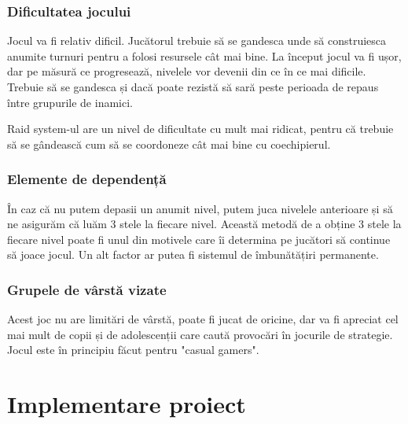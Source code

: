 \documentclass[12pt, a4paper]{article}
\begin{document}
	
	
	
	
	\subsubsection{Dificultatea jocului}
	
	Jocul va fi relativ dificil. Jucătorul trebuie să se gandesca unde să construiesca anumite turnuri pentru a folosi resursele cât mai bine. La început jocul va fi ușor, dar pe măsură ce progresează, nivelele vor devenii din ce în ce mai dificile. Trebuie să se gandesca și dacă poate rezistă să sară peste perioada de repaus între grupurile de inamici.
	\newline
	
	Raid system-ul are un nivel de dificultate cu mult mai ridicat, pentru că trebuie să se gândească cum să se coordoneze cât mai bine cu coechipierul.
	
	
	
	
	
	\subsubsection{Elemente de dependență}
	
	În caz că nu putem depasii un anumit nivel, putem juca nivelele anterioare și să ne asigurăm că luăm 3 stele la fiecare nivel. Această metodă de a obține 3 stele la fiecare nivel poate fi unul din motivele care îi determina pe jucători să continue să joace jocul. Un alt factor ar putea fi sistemul de îmbunătățiri permanente.
	
	
	
	
	
	\subsubsection{Grupele de vârstă vizate}
	
	Acest joc nu are limitări de vârstă, poate fi jucat de oricine, dar va fi apreciat cel mai mult de copii și de adolescenții care caută provocări în jocurile de strategie. Jocul este în principiu făcut pentru "casual gamers".
	
	
	
	
	
	\section{Implementare proiect}
	\label{section: projectImplementation}
	
\end{document}
